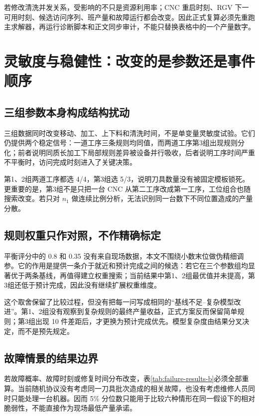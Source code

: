 \documentclass[UTF8,11pt,a4paper]{ctexart}
\begin{document}
若修改清洗并发关系，受影响的不只是资源利用率；CNC 重启时刻、RGV 下一可用时刻、候选访问序列、班产量和故障运行都会改变。因此正式复算必须先重跑主求解器，再运行诊断脚本和正文同步审计，不能只替换表格中的一个产量数字。

\section{灵敏度与稳健性：改变的是参数还是事件顺序}

\subsection{三组参数本身构成结构扰动}

三组数据同时改变移动、加工、上下料和清洗时间，不是单变量灵敏度试验。它们仍提供两个稳定信号：一道工序三条规则均同值，而两道工序第3组出现规则分化；前者说明同质长加工下局部规则差异被设备并行吸收，后者说明工序时间严重不平衡时，访问完成时刻进入了关键决策。

第1、2组两道工序都选 4/4，第3组选 5/3，说明刀具数量没有被固定模板锁死。更重要的是，第3组不是只把一台 CNC 从第二工序改成第一工序，工位组合也随搜索改变。若只对 $n_1$ 做连续比例分析，无法识别同一台数下不同位置造成的产量分散。

\subsection{规则权重只作对照，不作精确标定}

平衡评分中的 0.8 和 0.35 没有来自现场数据，本文不围绕小数末位做伪精细调参。它的作用是提供一条介于就近和预计完成之间的候选：若它在三个参数组均显著优于两条基线，再值得建立权重搜索；当前结果中第1、2组最优值并未提高，第3组还低于预计完成，因此没有继续扩展权重维度。

这个取舍保留了比较过程，但没有把每一问写成相同的“基线不足--复杂模型改进”。第1、2组没有观察到复杂规则的最终产量收益，正式方案反而保留简单规则；第3组出现 10 件差距后，才更换为预计完成优先。模型复杂度由结果分叉决定，而不是预先规定。

\subsection{故障情景的结果边界}

若故障概率、故障时刻或修复时间分布改变，表\ref{tab:failure-results-b}必须全部重算。当前随机协议没有考虑同一刀具批次造成的相关故障，也没有考虑维修人员同时只能处理一台机器。因而 5\% 分位数只能用于比较六种情形在同一假设下的相对脆弱性，不能直接作为现场最低产量承诺。
\end{document}
